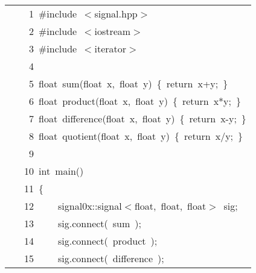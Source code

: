 \documentclass[9pt,onside,a4paper]{article}
\newcommand{\hlstd}[1]{\textcolor[rgb]{0.2,0,0.4}{#1}}
\newcommand{\hlppc}[1]{\textcolor[rgb]{0.33,0.45,0.69}{#1}}
\newcommand{\hlopt}[1]{\textcolor[rgb]{0.33,0.33,0.33}{#1}}
\newcommand{\hllin}[1]{\textcolor[rgb]{0.6,0.6,0.6}{#1}}
\newcommand{\hlkwa}[1]{\textcolor[rgb]{1,0.19,0.19}{#1}}
\newcommand{\hlkwb}[1]{\textcolor[rgb]{0.96,0.55,0.14}{#1}}
\newcommand{\hlkwd}[1]{\textcolor[rgb]{0.82,0.11,0.93}{#1}}
\begin{document}
\ttfamily
\begin{center}
\begin{xtabular}{||l||}
\hline
\hlstd{}\hllin{\ \ \ \ 1\ }\hlppc{\#include\ $<$signal.hpp$>$}\\
\hllin{\ \ \ \ 2\ }\hlstd{}\hlppc{\#include\ $<$iostream$>$}\\
\hllin{\ \ \ \ 3\ }\hlstd{}\hlppc{\#include\ $<$iterator$>$}\\
\hllin{\ \ \ \ 4\ }\hlstd{}\\
\hllin{\ \ \ \ 5\ }\hlkwb{float\ }\hlstd{}\hlkwd{sum}\hlstd{}\hlopt{(}\hlstd{}\hlkwb{float\ }\hlstd{x}\hlopt{,\ }\hlstd{}\hlkwb{float\ }\hlstd{y}\hlopt{)\ \{\ }\hlstd{}\hlkwa{return\ }\hlstd{x}\hlopt{+}\hlstd{y}\hlopt{;\ \}}\\
\hllin{\ \ \ \ 6\ }\hlstd{}\hlkwb{float\ }\hlstd{}\hlkwd{product}\hlstd{}\hlopt{(}\hlstd{}\hlkwb{float\ }\hlstd{x}\hlopt{,\ }\hlstd{}\hlkwb{float\ }\hlstd{y}\hlopt{)\ \{\ }\hlstd{}\hlkwa{return\ }\hlstd{x}\hlopt{{*}}\hlstd{y}\hlopt{;\ \}}\\
\hllin{\ \ \ \ 7\ }\hlstd{}\hlkwb{float\ }\hlstd{}\hlkwd{difference}\hlstd{}\hlopt{(}\hlstd{}\hlkwb{float\ }\hlstd{x}\hlopt{,\ }\hlstd{}\hlkwb{float\ }\hlstd{y}\hlopt{)\ \{\ }\hlstd{}\hlkwa{return\ }\hlstd{x}\hlopt{{-}}\hlstd{y}\hlopt{;\ \}}\\
\hllin{\ \ \ \ 8\ }\hlstd{}\hlkwb{float\ }\hlstd{}\hlkwd{quotient}\hlstd{}\hlopt{(}\hlstd{}\hlkwb{float\ }\hlstd{x}\hlopt{,\ }\hlstd{}\hlkwb{float\ }\hlstd{y}\hlopt{)\ \{\ }\hlstd{}\hlkwa{return\ }\hlstd{x}\hlopt{/}\hlstd{y}\hlopt{;\ \}}\\
\hllin{\ \ \ \ 9\ }\hlstd{}\\
\hllin{\ \ \ 10\ }\hlkwb{int\ }\hlstd{}\hlkwd{main}\hlstd{}\hlopt{()}\\
\hllin{\ \ \ 11\ }\hlstd{}\hlopt{\{}\\
\hllin{\ \ \ 12\ }\hlstd{}\hlstd{\ \ \ \ }\hlstd{signal0x}\hlopt{::}\hlstd{signal}\hlopt{$<$}\hlstd{}\hlkwb{float}\hlstd{}\hlopt{,\ }\hlstd{}\hlkwb{float}\hlstd{}\hlopt{,\ }\hlstd{}\hlkwb{float}\hlstd{}\hlopt{$>$\ }\hlstd{sig}\hlopt{;}\\
\hllin{\ \ \ 13\ }\hlstd{}\hlstd{\ \ \ \ }\hlstd{sig}\hlopt{.}\hlstd{}\hlkwd{connect}\hlstd{}\hlopt{(\ }\hlstd{sum\ }\hlopt{);}\\
\hllin{\ \ \ 14\ }\hlstd{}\hlstd{\ \ \ \ }\hlstd{sig}\hlopt{.}\hlstd{}\hlkwd{connect}\hlstd{}\hlopt{(\ }\hlstd{product\ }\hlopt{);}\\
\hllin{\ \ \ 15\ }\hlstd{}\hlstd{\ \ \ \ }\hlstd{sig}\hlopt{.}\hlstd{}\hlkwd{connect}\hlstd{}\hlopt{(\ }\hlstd{difference\ }\hlopt{);}\\

\end{xtabular}
\end{center}
\end{document}
